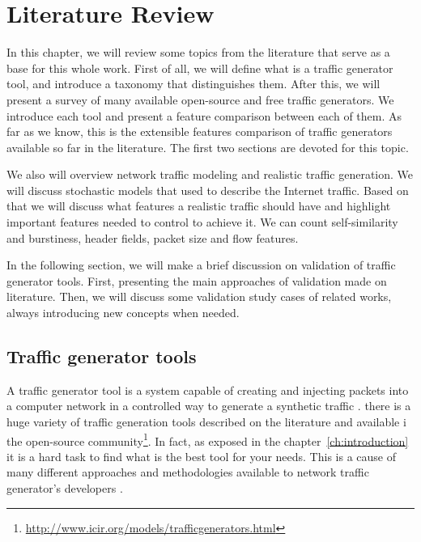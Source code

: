 \chapter{Literature Review}\label{ch:literature-review}

In this chapter, we will review some topics from the literature that serve as a base for this whole work. First of all, we will define what is a traffic generator tool, and introduce a taxonomy that distinguishes them. After this, we will present a survey of many available open-source and free traffic generators. We introduce each tool and present a feature comparison between each of them. As far as we know, this is the extensible features comparison of traffic generators available so far in the literature. The first two sections are devoted for this topic.

We also will overview network traffic modeling and realistic traffic generation. We will discuss stochastic models that used to describe the Internet traffic. Based on that we will discuss what features a realistic traffic should have and highlight important features needed to control to achieve it.  We can count self-similarity and burstiness,  header fields, packet size and flow features.

In the following section, we will make a brief discussion on validation of traffic generator tools. First, presenting the main approaches of validation made on literature. Then, we will discuss some validation study cases of related works, always introducing new concepts when needed.


\section{Traffic generator tools}

A traffic generator tool is a system capable of creating and injecting packets into a computer network in a controlled way to generate a synthetic traffic \cite{validate-trafficgen}.  there is a huge variety of traffic generation tools described on the literature \cite{validate-trafficgen} \cite{ditg-paper} and available i the open-source community\footnote{\href{http://www.icir.org/models/trafficgenerators.html}{http://www.icir.org/models/trafficgenerators.html}}. In fact, as exposed in the chapter~\ref{ch:introduction} it is a hard task to find what is the best tool for your needs. This is a cause of many  different approaches and methodologies available to network traffic generator's developers \cite{validate-trafficgen}.

